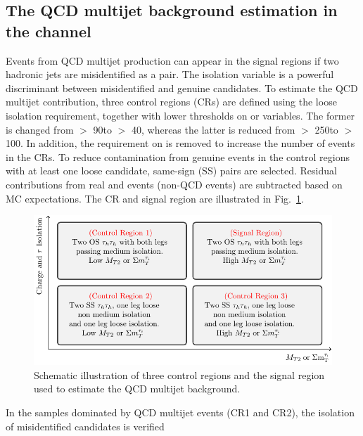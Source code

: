 \subsection{\texorpdfstring{The QCD multijet background estimation in the \tauTau channel}{The QCD multijet background estimation in the tau-tau channel}}
\label{sect:bkgQCD}
Events from QCD multijet production can appear in the signal regions if two hadronic jets are misidentified as a \tauTau pair.
The isolation variable is a powerful discriminant between misidentified and genuine \Tau candidates. To estimate the QCD multijet contribution, three \tauTau control regions (CRs) are defined using the loose \Tau isolation requirement, together with lower thresholds on \mttwo or \SumMT variables. The former is changed from \mttwo $>$ 90\GeV to \mttwo $>$ 40\GeV, whereas the latter is reduced from \SumMT $>$ 250\GeV to \SumMT $>$ 100\GeV. In addition, the requirement on \deltaphi is removed to increase the number of events in the CRs. 
To reduce contamination from genuine \tauTau events 
in the control regions with at least one loose \Tau candidate, 
same-sign (SS) \tauTau pairs are selected. Residual contributions from real 
\tauTau and \wjets events (non-QCD events) are subtracted based on MC expectations. 
The CR and signal region are illustrated in Fig.~\ref{fig:ABCDQCD}. 
\begin{figure}[!htb]
\centering
\includegraphics[angle=0,scale=1.15]{Bkg/ABCD.pdf}
\caption{Schematic illustration of three control regions and the signal region used to estimate the QCD multijet background.}
\label{fig:ABCDQCD}
\end{figure}
In the samples dominated by QCD multijet events (CR1 and CR2), the isolation of misidentified \Tau candidates is verified 
